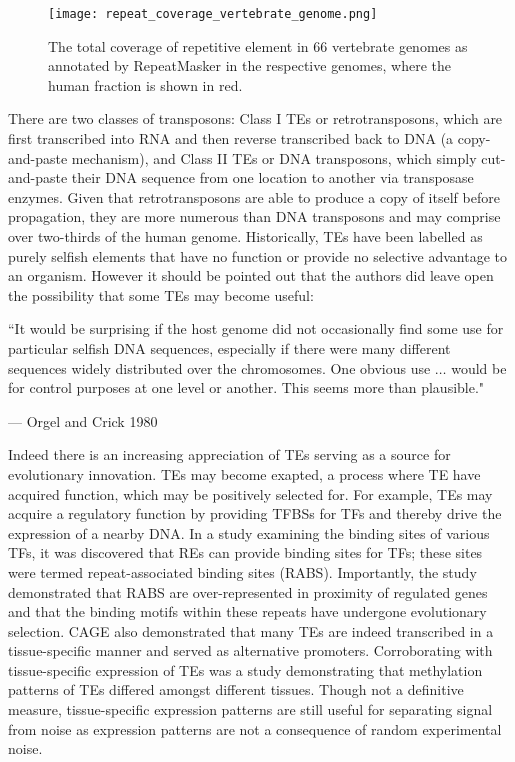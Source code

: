 \begin{figure}[!ht]
   \centering
   \texttt{[image: repeat\_coverage\_vertebrate\_genome.png]}
   \caption[Coverage of repetitive elements in vertebrate genomes]{The total coverage of repetitive element in 66 vertebrate genomes as annotated by RepeatMasker in the respective genomes, where the human fraction is shown in red\cite{tang2014repcoverage}.}
   \label{fig:repeat_coverage_vertebrate_genome}
\end{figure}

There are two classes of transposons: Class I TEs or retrotransposons, which are first transcribed into RNA and then reverse transcribed back to DNA (a copy-and-paste mechanism), and Class II TEs or DNA transposons, which simply cut-and-paste their DNA sequence from one location to another via transposase enzymes. Given that retrotransposons are able to produce a copy of itself before propagation, they are more numerous than DNA transposons and may comprise over two-thirds of the human genome\cite{pmid22144907}. Historically, TEs have been labelled as purely selfish elements that have no function or provide no selective advantage to an organism\cite{doolittle1980selfish, orgel1980selfish}. However it should be pointed out that the authors did leave open the possibility that some TEs may become useful:

\epigraph{``It would be surprising if the host genome did not occasionally find some use for particular selfish DNA sequences, especially if there were many different sequences widely distributed over the chromosomes. One obvious use $\ldots$ would be for control purposes at one level or another. This seems more than plausible."}{--- \textup{Orgel and Crick 1980}}

Indeed there is an increasing appreciation of TEs serving as a source for evolutionary innovation\cite{Muotri15102007, pmid18368054}. TEs may become exapted, a process where TE have acquired function, which may be positively selected for. For example, TEs may acquire a regulatory function by providing TFBSs for TFs and thereby drive the expression of a nearby DNA. In a study examining the binding sites of various TFs, it was discovered that REs can provide binding sites for TFs; these sites were termed repeat-associated binding sites (RABS)\cite{pmid18682548}. Importantly, the study demonstrated that RABS are over-represented in proximity of regulated genes and that the binding motifs within these repeats have undergone evolutionary selection. CAGE also demonstrated that many TEs are indeed transcribed in a tissue-specific manner and served as alternative promoters\cite{pmid19377475}. Corroborating with tissue-specific expression of TEs was a study demonstrating that methylation patterns of TEs differed amongst different tissues\cite{pmid23708189}. Though not a definitive measure, tissue-specific expression patterns are still useful for separating signal from noise as expression patterns are not a consequence of random experimental noise.

